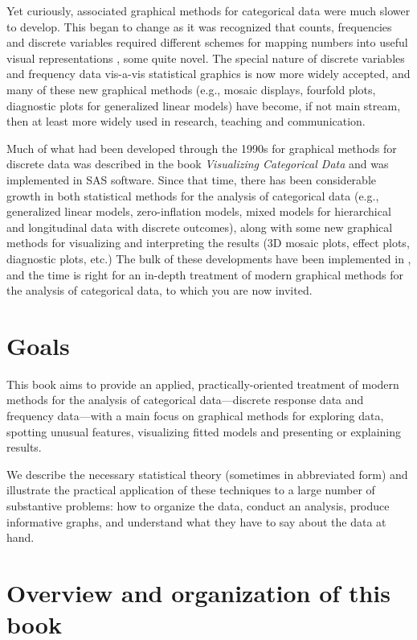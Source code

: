 Yet curiously, associated graphical methods for categorical data were 
much slower to develop. This began to change as it was recognized that
counts, frequencies and discrete variables required different
schemes for mapping numbers into useful visual representations \citep{Friendly:95,Friendly:97},
some quite novel.
The special nature of discrete variables
and frequency data vis-a-vis statistical graphics is now more widely accepted,
and many of these new graphical methods (e.g., mosaic displays, fourfold plots, diagnostic
plots for generalized linear models) have become, if not main stream, then at
least more widely used in research, teaching and communication.

Much of what had been developed through the 1990s for graphical methods for
discrete data was described in the book \emph{Visualizing Categorical Data}
\citep{Friendly:00:VCD} and was implemented in SAS\textsuperscript{\textregistered} software. 
Since that time,  
there has been considerable growth in both statistical methods for the
analysis of categorical data (e.g., generalized linear models, zero-inflation
models, mixed models for hierarchical and longitudinal data with discrete
outcomes), along with some new graphical methods for visualizing and
interpreting the results (3D mosaic plots, effect plots, diagnostic plots, etc.) 
The bulk of these developments have been implemented in \R, and the time is
right for an in-depth treatment of modern graphical methods for the analysis
of categorical data, to which you are now invited.

\section*{Goals}
This book aims to provide an applied, practically-oriented treatment of 
modern methods for the analysis of categorical data---discrete response data
and frequency data---with a main focus on graphical methods for exploring data,
spotting unusual features, visualizing fitted models and presenting or explaining
results.

We describe the necessary statistical theory (sometimes in abbreviated form)
and illustrate the practical application of these techniques to a large number
of substantive problems: how to organize the data, conduct an analysis, 
produce informative graphs, and understand what they have to say about the
data at hand.  

\section*{Overview and organization of this book}

 

